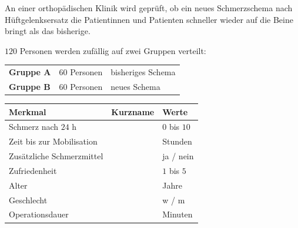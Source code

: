 \begin{merksatz}
\begin{center}
\begin{minipage}{0.9\textwidth}
An einer orthopädischen Klinik wird geprüft, ob ein neues Schmerzschema nach Hüftgelenksersatz die Patientinnen und Patienten schneller wieder auf die Beine bringt als das bisherige.

$120$ Personen werden zufällig auf zwei Gruppen verteilt:
\end{minipage}
\end{center}

\begin{center}
\renewcommand{\arraystretch}{1.5}
\begin{tabular}{@{}P{2.0cm}P{2.0cm}P{4.0cm}@{}}
\toprule
\textbf{Gruppe A} & $60$ Personen & bisheriges Schema\\
\textbf{Gruppe B} & $60$ Personen & neues Schema\\
\bottomrule
\end{tabular}
\end{center}

\begin{center}
{\small
\renewcommand{\arraystretch}{1.45}
\begin{tabular}{@{}P{3.4cm}P{2.4cm}P{2.6cm}@{}}
\toprule
\textbf{Merkmal} & \textbf{Kurzname} & \textbf{Werte}\\
\midrule
Schmerz nach $24$ h &  & $0$ bis $10$\\
Zeit bis zur Mobilisation &  & Stunden\\
Zusätzliche Schmerzmittel &  & ja / nein\\
Zufriedenheit &  & $1$ bis $5$\\
Alter &  & Jahre\\
Geschlecht &  & w / m\\
Operationsdauer &  & Minuten\\
\bottomrule
\end{tabular}}
\end{center}

\begin{center}
\begin{minipage}{0.88\textwidth}
\end{minipage}
\end{center}
\end{merksatz}

